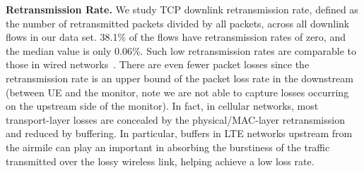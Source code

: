 
\textbf{Retransmission Rate.} We study TCP downlink retransmission rate, defined as the number of retransmitted packets divided by all packets, across all downlink flows in our data set. 38.1\% of the flows have retransmission rates of zero, and the median value is only 0.06\%. Such low retransmission rates are comparable to those in wired networks~\cite{qian09}. There are even fewer packet losses since the retransmission rate is an upper bound of the packet loss rate in the downstream (\ie between UE and the monitor, note we are not able to capture losses occurring on the upstream side of the monitor). In fact, in cellular networks, most transport-layer losses are concealed by the physical/MAC-layer retransmission and reduced by buffering.
In particular, buffers in LTE networks upstream from the airmile can play an important in absorbing the burstiness of the
traffic transmitted over the lossy wireless link, helping achieve a low loss rate.



\label{sec:tcp.compare}

